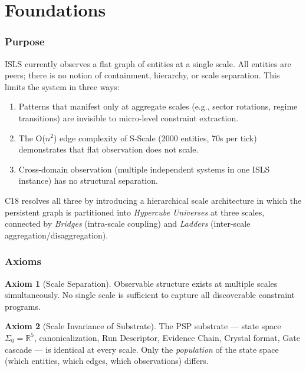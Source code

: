 \documentclass[11pt,a4paper,twoside]{article}
\theoremstyle{definition}
\newtheorem{axiom}{Axiom}[section]
\theoremstyle{plain}
\theoremstyle{remark}
\newcommand{\ISLS}{\textsf{ISLS}}
\newcommand{\RR}{\mathbb{R}}
\begin{document}
\tableofcontents
\newpage


\part{Foundations}\label{part:foundations}

\section{Purpose}\label{sec:purpose}

\ISLS{} currently observes a flat graph of entities at a single scale.
All entities are peers; there is no notion of containment, hierarchy,
or scale separation. This limits the system in three ways:

\begin{enumerate}[nosep]
  \item Patterns that manifest only at aggregate scales (e.g., sector
        rotations, regime transitions) are invisible to micro-level
        constraint extraction.
  \item The O($n^2$) edge complexity of S-Scale (2000 entities, 70s per
        tick) demonstrates that flat observation does not scale.
  \item Cross-domain observation (multiple independent systems in one
        \ISLS{} instance) has no structural separation.
\end{enumerate}

C18 resolves all three by introducing a hierarchical scale architecture
in which the persistent graph is partitioned into \emph{Hypercube
Universes} at three scales, connected by \emph{Bridges} (intra-scale
coupling) and \emph{Ladders} (inter-scale aggregation/disaggregation).


\section{Axioms}\label{sec:axioms}

\begin{axiom}[Scale Separation]\label{ax:scalesep}
Observable structure exists at multiple scales simultaneously. No
single scale is sufficient to capture all discoverable constraint
programs.
\end{axiom}

\begin{axiom}[Scale Invariance of Substrate]\label{ax:scaleinv}
The PSP substrate --- state space $\Sigma_0 = \RR^5$, canonicalization,
Run Descriptor, Evidence Chain, Crystal format, Gate cascade --- is
identical at every scale. Only the \emph{population} of the state space
(which entities, which edges, which observations) differs.
\end{axiom}
\end{document}
